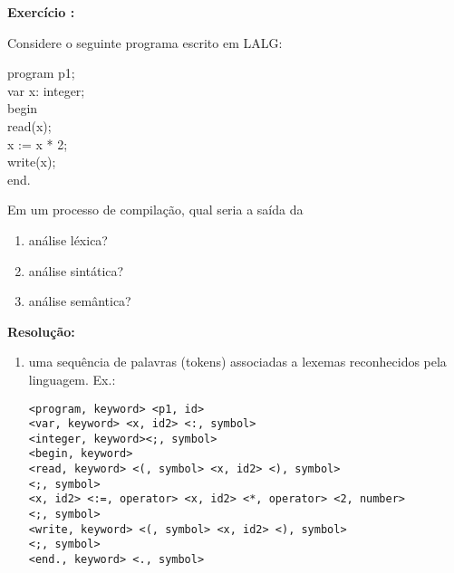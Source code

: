 

\setcounter{count}{0}
\renewcommand{\labelenumi}{\alph{enumi}.}
\newcommand{\exercise}[2]{%
  \stepcounter{count}%
  \noindent\textbf{Exercício \thecount:}

  #1
  
  \noindent\textbf{Resolução:}%
  
  #2 
  
}


\maketitle

\exercise{
	Considere o seguinte programa escrito em LALG:

	program p1;\\
	var x: integer;\\
	begin\\
	\hspace*{2em} read(x);\\
	\hspace*{2em} x := x * 2;\\
	\hspace*{2em} write(x);\\
	end.

	Em um processo de compilação, qual seria a saída da

	\begin{enumerate}
		\item análise léxica?
		\item análise sintática?
		\item análise semântica?
	\end{enumerate}
} {
	\begin{enumerate}
		\item uma sequência de palavras (tokens) associadas a lexemas
		      reconhecidos pela linguagem. Ex.:

		      \texttt{<program, keyword> <p1, id>\\
			      <var, keyword> <x, id2> <:, symbol>\\
			      <integer, keyword><;, symbol>\\
			      <begin, keyword>\\
			      <read, keyword> <(, symbol> <x, id2> <), symbol>\\
			      <;, symbol>\\
			      <x, id2> <:=, operator> <x, id2> <*, operator> <2, number>\\
			      <;, symbol>\\
			      <write, keyword> <(, symbol> <x, id2> <), symbol>\\
			      <;, symbol>\\
			      <end., keyword> <., symbol>\\}


\end{enumerate}}
